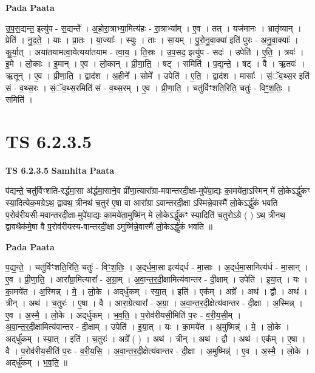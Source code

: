 \documentclass[17pt]{extarticle}
\begin{document}
\textbf{Pada Paata} \newline

उ॒प॒स॒द्यन्त॒ इत्यु॑प - स॒द्यन्ते᳚ । अ॒हो॒रा॒त्राभ्या॒मित्य॑हः - रा॒त्राभ्या᳚म् । ए॒व । तत् । यज॑मानः । भ्रातृ॑व्यान् । प्रेति॑ । नु॒द॒ते॒ । याः । प्रा॒तः । या॒ज्याः᳚ । स्युः । ताः । सा॒यम् । पु॒रो॒नु॒वा॒क्या॑ इति॑ पुरः - अ॒नु॒वा॒क्याः᳚ । कु॒र्या॒त् । अया॑तयामत्वा॒येत्यया॑तयाम - त्वा॒य॒ । ति॒स्रः । उ॒प॒सद॒ इत्यु॑प - सदः॑ । उपेति॑ । ए॒ति॒ । त्रयः॑ । इ॒मे । लो॒काः । इ॒मान् । ए॒व । लो॒कान् । प्री॒णा॒ति॒ । षट् । समिति॑ । प॒द्य॒न्ते॒ । षट् । वै । ऋ॒तवः॑ । ऋ॒तून् । ए॒व । प्री॒णा॒ति॒ । द्वाद॑श । अ॒हीने᳚ । सोमे᳚ । उपेति॑ । ए॒ति॒ । द्वाद॑श । मासाः᳚ । सं॒ॅव॒थ्स॒र इति॑ सं - व॒थ्स॒रः । सं॒ॅव॒थ्स॒रमिति॑ सं - व॒थ्स॒रम् । ए॒व । प्री॒णा॒ति॒ । चतु॑र्विꣳशति॒रिति॒ चतुः॑ - विꣳ॒॒श॒तिः॒ । समिति॑ ।  \newline





\section{ TS 6.2.3.5 }

\textbf{TS 6.2.3.5 } \newline
\textbf{Samhita Paata} \newline

प॑द्यन्ते॒ चतु॑र्विꣳशति-रर्द्धमा॒सा अ॑र्द्धमा॒साने॒व प्री॑णा॒त्यारा᳚ग्रा-मवान्तरदी॒क्षा-मुपे॑या॒द्यः का॒मये॑ता॒ऽस्मिन् मे॑ लो॒केऽर्द्धु॑कꣳ स्या॒दित्येक॒मग्रेऽथ॒ द्वावथ॒ त्रीनथ॑ च॒तुर॑ ए॒षा वा आरा᳚ग्रा ऽवान्तरदी॒क्षा ऽस्मिन्ने॒वास्मै॑ लो॒केऽर्द्धु॑कं भवति प॒रोव॑रीयसी-मवान्तरदी॒क्षा-मुपे॑या॒द्यः का॒मये॑ता॒मुष्मि॑न् मे लो॒केऽर्द्धु॑कꣳ स्या॒दिति॑ च॒तुरोऽग्रे ( ) ऽथ॒ त्रीनथ॒ द्वावथैक॑मे॒षा वै प॒रोव॑रीयस्य-वान्तरदी॒क्षा ऽमुष्मि॑न्ने॒वास्मै॑ लो॒केऽर्द्धु॑कं भवति ॥ \newline

\textbf{Pada Paata} \newline

प॒द्य॒न्ते॒ । चतु॑र्विꣳशति॒रिति॒ चतुः॑ - विꣳ॒॒श॒तिः॒ । अ॒द्‌र्ध॒मा॒सा इत्य॑द्‌र्ध - मा॒साः । अ॒द्‌र्ध॒मा॒सानित्य॑र्ध - मा॒सान् । ए॒व । प्री॒णा॒ति॒ । आरा᳚ग्रा॒मित्यारा᳚ - अ॒ग्रा॒म् । अ॒वा॒न्त॒र॒दी॒क्षामित्य॑वान्तर - दी॒क्षाम् । उपेति॑ । इ॒या॒त् । यः । का॒मये॑त । अ॒स्मिन्न् । मे॒ । लो॒के । अद्‌र्धु॑कम् । स्या॒त् । इति॑ । एक᳚म् । अग्रे᳚ । अथ॑ । द्वौ । अथ॑ । त्रीन् । अथ॑ । च॒तुरः॑ । ए॒षा । वै । आरा॒ग्रेत्यारा᳚ - अ॒ग्रा॒ । अ॒वा॒न्त॒र॒दी॒क्षेत्य॑वान्तर - दी॒क्षा । अ॒स्मिन्न् । ए॒व । अ॒स्मै॒ । लो॒के । अद्‌र्धु॑कम् । भ॒व॒ति॒ । प॒रोव॑रीयसी॒मिति॑ प॒रः - व॒री॒य॒सी॒म् । अ॒वा॒न्त॒र॒दी॒क्षामित्य॑वान्तर - दी॒क्षाम् । उपेति॑ । इ॒या॒त् । यः । का॒मये॑त । अ॒मुष्मिन्न्॑ । मे॒ । लो॒के । अद्‌र्धु॑कम् । स्या॒त् । इति॑ । च॒तुरः॑ । अग्रे᳚ ( ) । अथ॑ । त्रीन् । अथ॑ । द्वौ । अथ॑ । एक᳚म् । ए॒षा । वै । प॒रोव॑रीय॒सीति॑ प॒रः - व॒री॒य॒सि॒ । अ॒वा॒न्त॒र॒दी॒क्षेत्य॑वान्तर - दी॒क्षा । अ॒मुष्मिन्न्॑ । ए॒व । अ॒स्मै॒ । लो॒के । अद्‌र्धु॑कम् । भ॒व॒ति॒ ॥  \newline
\end{document}
